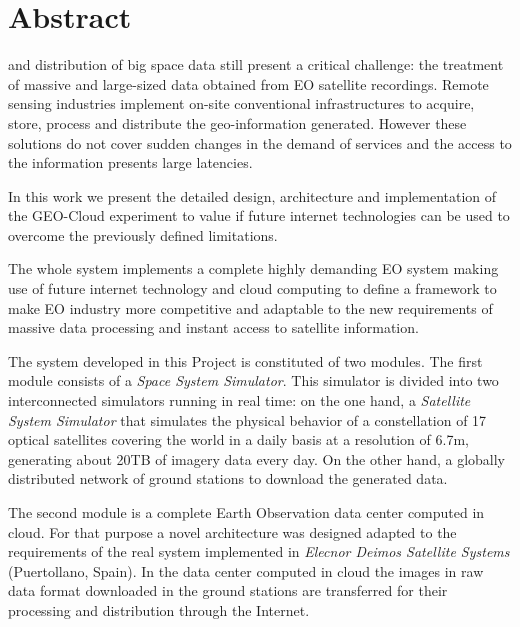 \chapter{Abstract}

 and distribution of big space data still present a critical
challenge: the treatment of massive and large-sized data obtained from \acf{EO}
satellite recordings. Remote sensing industries implement on-site conventional
infrastructures to acquire, store, process and distribute the geo-information
generated. However these solutions do not cover sudden changes in the demand of
services and the access to the information presents large latencies.


In this work we present the detailed design, architecture and implementation of
the GEO-Cloud experiment to value if future internet technologies can be used to
overcome the previously defined limitations. 

The whole system implements a complete highly demanding \acs{EO} system making use of future internet technology and cloud computing to define a framework to make \acs{EO} industry more competitive and adaptable to the new requirements of massive data processing and instant access to satellite information.

The system developed in this Project is constituted of two modules. The first
module consists of a \emph{Space System Simulator}. This simulator is divided
into two interconnected simulators running in real time: on the one hand, a
\emph{Satellite System Simulator} that simulates the physical behavior of a
constellation of 17 optical satellites covering the world in a daily basis at a
resolution of 6.7m, generating about 20TB of imagery data every day. On the
other hand, a globally distributed network of ground stations to download the
generated data.


The second module is a complete Earth Observation data center computed in cloud. For that purpose a novel architecture was designed adapted to the requirements of the real system implemented in \emph{Elecnor Deimos Satellite Systems} (Puertollano, Spain).  In the data center computed in cloud the images in raw data format downloaded in the ground stations are transferred for their processing and distribution through the Internet.